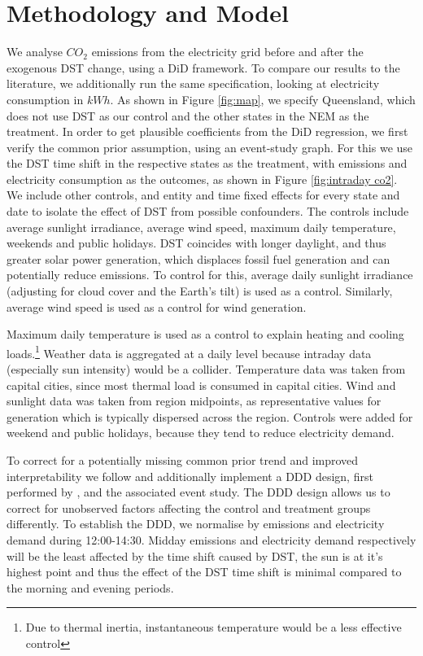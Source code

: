 \section{Methodology and Model}

We analyse $CO_2$ emissions from the electricity grid before and after the exogenous \ac{DST} change, using a \acf{DiD} framework. To compare our results to the literature, we additionally run the same specification, looking at electricity consumption in $kWh$. As shown in Figure \ref{fig:map}, we specify Queensland, which does not use \ac{DST} as our control and the other states in the \ac{NEM} as the treatment. In order to get plausible coefficients from the \ac{DiD} regression, we first verify the common prior assumption, using an event-study graph.
For this we use the \ac{DST} time shift in the respective states as the treatment, with emissions and electricity consumption as the outcomes, as shown in Figure \ref{fig:intraday co2}. We include other controls, and entity and time fixed effects for every state and date to isolate the effect of \ac{DST} from possible confounders. 
The controls include average sunlight irradiance, average wind speed, maximum daily temperature, weekends and public holidays.
\ac{DST} coincides with longer daylight, and thus greater solar power generation, which displaces fossil fuel generation and can potentially reduce emissions. To control for this, average daily sunlight irradiance (adjusting for cloud cover and the Earth's tilt) is used as a control. Similarly, average wind speed is used as a control for wind generation.

Maximum daily temperature is used as a control to explain heating and cooling loads.\footnote{Due to thermal inertia, instantaneous temperature would be a less effective control}
Weather data is aggregated at a daily level because intraday data (especially sun intensity) would be a collider.
Temperature data was taken from capital cities, since most thermal load is consumed in capital cities. Wind and sunlight data was taken from region midpoints, as representative values for generation which is typically dispersed across the region.
Controls were added for weekend and public holidays, because they tend to reduce electricity demand.

To correct for a potentially missing common prior trend and improved interpretability we follow \textcite{kellogg_daylight_2008} and additionally implement a \ac{DDD} design, first performed by \textcite{gruber_incidence_1994}, and the associated event study. The DDD design allows us to correct for unobserved factors affecting the control and treatment groups differently. To establish the \ac{DDD}, we normalise by emissions and electricity demand during 12:00-14:30. Midday emissions and electricity demand respectively will be the least affected by the time shift caused by DST, the sun is at it's highest point and thus the effect of the DST time shift is minimal compared to the morning and evening periods.

